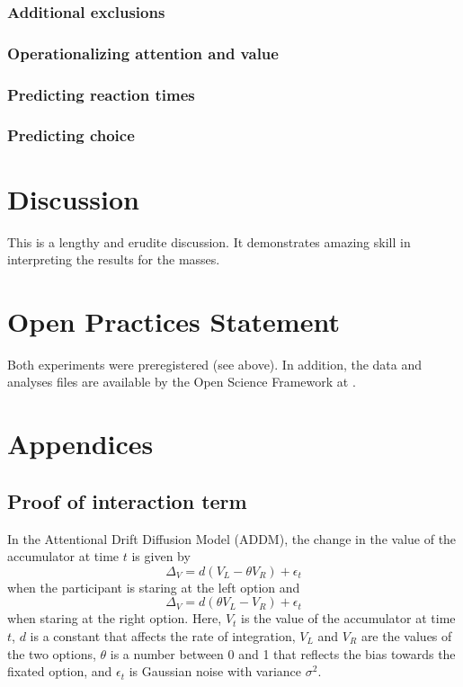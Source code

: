\documentclass[doc, a4paper, apacite]{apa6}
\begin{document}
\subsubsection{Additional exclusions}

\subsubsection{Operationalizing attention and value}

\subsubsection{Predicting reaction times}

\subsubsection{Predicting choice}



\section{Discussion}
This is a lengthy and erudite discussion.  It demonstrates amazing
skill in interpreting the results for the masses.

\section{Open Practices Statement}
Both experiments were preregistered (see above). In addition, the data and analyses files are available by the Open Science Framework at \url{}. 

\clearpage
\newpage



\clearpage
\newpage
\section{Appendices}

\subsection{Proof of interaction term}
In the Attentional Drift Diffusion Model (ADDM), the change in the value of the accumulator at time $t$ is given by 
\begin{equation}
	\Delta_V = d(V_L - \theta V_R) + \epsilon_t
\end{equation}
when the participant is staring at the left option and
\begin{equation}
	\Delta_V = d(\theta V_L - V_R) + \epsilon_t
\end{equation}
when staring at the right option. Here, $V_t$ is the value of the accumulator at time $t$, $d$ is a constant that affects the rate of integration, $V_L$ and $V_R$ are the values of the two options, $\theta$ is a number between 0 and 1 that reflects the bias towards the fixated option, and $\epsilon_t$ is Gaussian noise with variance $\sigma^2$. 
\end{document}
